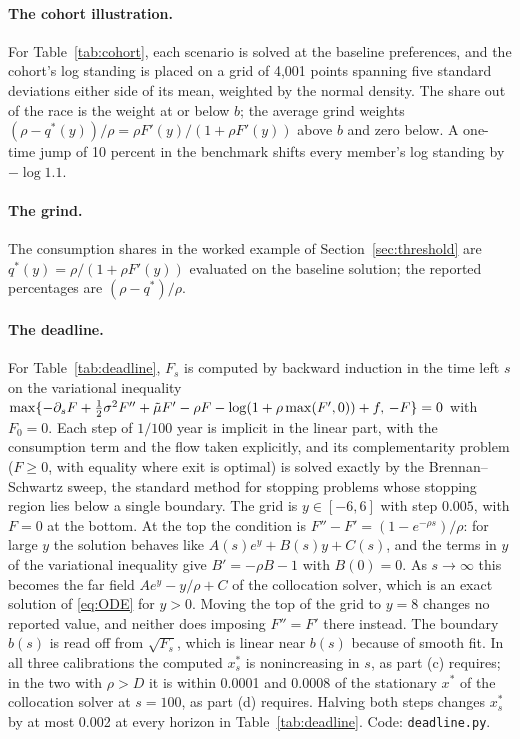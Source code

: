 \paragraph{The cohort illustration.} For Table~\ref{tab:cohort}, each scenario is solved at the baseline preferences, and the cohort's log standing is placed on a grid of 4,001 points spanning five standard deviations either side of its mean, weighted by the normal density. The share out of the race is the weight at or below $b$; the average grind weights $(\rho-q^*(y))/\rho=\rho F'(y)/(1+\rho F'(y))$ above $b$ and zero below. A one-time jump of 10 percent in the benchmark shifts every member's log standing by $-\log 1.1$.

\paragraph{The grind.} The consumption shares in the worked example of Section~\ref{sec:threshold} are $q^*(y)=\rho/(1+\rho F'(y))$ evaluated on the baseline solution; the reported percentages are $(\rho-q^*)/\rho$.

\paragraph{The deadline.} For Table~\ref{tab:deadline}, $F_s$ is computed by backward induction in the time left $s$ on the variational inequality $\max\{-\partial_sF+\tfrac12\sigma^2F''+\tilde\mu F'-\rho F-\log(1+\rho\max(F',0))+f,\,-F\}=0$ with $F_0=0$. Each step of $1/100$ year is implicit in the linear part, with the consumption term and the flow taken explicitly, and its complementarity problem ($F\ge0$, with equality where exit is optimal) is solved exactly by the Brennan--Schwartz sweep, the standard method for stopping problems whose stopping region lies below a single boundary. The grid is $y\in[-6,6]$ with step $0.005$, with $F=0$ at the bottom. At the top the condition is $F''-F'=(1-e^{-\rho s})/\rho$: for large $y$ the solution behaves like $A(s)e^y+B(s)y+C(s)$, and the terms in $y$ of the variational inequality give $B'=-\rho B-1$ with $B(0)=0$. As $s\to\infty$ this becomes the far field $Ae^y-y/\rho+C$ of the collocation solver, which is an exact solution of \eqref{eq:ODE} for $y>0$. Moving the top of the grid to $y=8$ changes no reported value, and neither does imposing $F''=F'$ there instead. The boundary $b(s)$ is read off from $\sqrt{F_s}$, which is linear near $b(s)$ because of smooth fit. In all three calibrations the computed $x^*_s$ is nonincreasing in $s$, as part (c) requires; in the two with $\rho>D$ it is within 0.0001 and 0.0008 of the stationary $x^*$ of the collocation solver at $s=100$, as part (d) requires. Halving both steps changes $x^*_s$ by at most 0.002 at every horizon in Table~\ref{tab:deadline}. Code: \texttt{deadline.py}.
